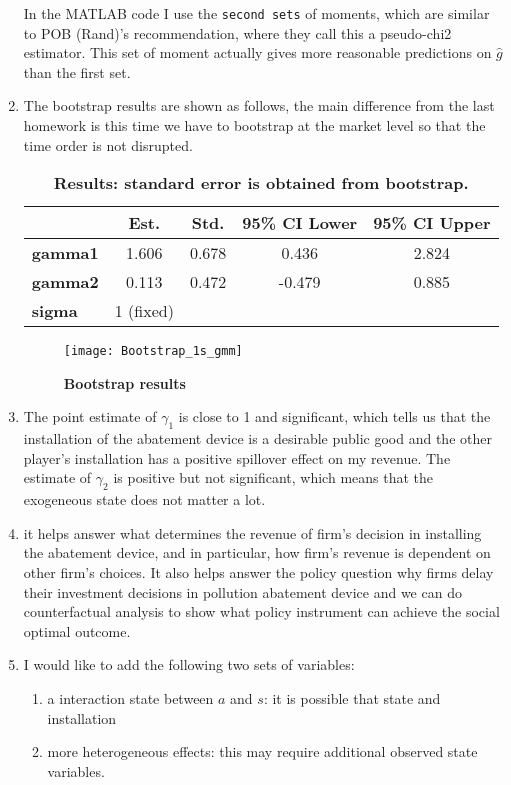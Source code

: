 \documentclass{article}
\begin{document}
\begin{enumerate}
In the MATLAB code I use the \texttt{second sets} of moments, which are
similar to POB (Rand)'s recommendation, where they call this a pseudo-chi2 estimator. This set of moment actually gives
more reasonable predictions on $\hat{g}$ than the first set.

\item The bootstrap results are shown as follows, the main difference from the last homework is this time we have to bootstrap at the market level so that the time order is not disrupted.


\begin{table}[htbp]
	\centering
	\caption{\textbf{Results: standard error is obtained from bootstrap.}}
	\begin{tabular}{lcccc}
		\toprule
		& \textbf{Est.} & \textbf{Std.} & \textbf{95\% CI Lower} & \textbf{95\% CI Upper} \\
		\midrule
		\textbf{gamma1} & 1.606 & 0.678 & 0.436 & 2.824 \\
		\textbf{gamma2} & 0.113 & 0.472 & -0.479 & 0.885 \\
		\textbf{sigma} & 1 (fixed) &       &       &  \\
		\bottomrule
	\end{tabular}%
	\label{tab:addlabel5}%
\end{table}%

\begin{figure}[h]
	\centering
	\texttt{[image: Bootstrap\_1s\_gmm]}
	\caption{\textbf{Bootstrap results}}
	\label{fig:bootstrap1sgmm}
\end{figure}


\item The point estimate of $\gamma _{1}$ is close to 1 and significant,
which tells us that the installation of the abatement device is a desirable
public good and the other player's installation has a positive spillover
effect on my revenue. The estimate of $\gamma _{2}$ is positive but not
significant, which means that the exogeneous state does not matter a lot.

\item it helps answer what determines the revenue of firm's decision in
installing the abatement device, and in particular, how firm's revenue is
dependent on other firm's choices. It also helps answer the policy question
why firms delay their investment decisions in pollution abatement device and
we can do counterfactual analysis to show what policy instrument can achieve
the social optimal outcome.

\item I would like to add the following two sets of variables:

\begin{enumerate}
\item a interaction state between $a$ and $s$: it is possible that state and
installation  

\item more heterogeneous effects: this may require additional observed state
variables.
\end{enumerate}
\end{enumerate}
\end{document}
